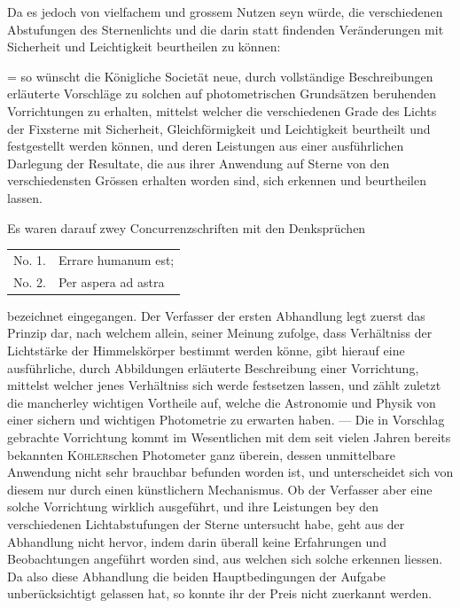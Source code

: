 Da es jedoch von vielfachem und grossem Nutzen seyn würde, die verschiedenen Abstufungen des Sternenlichts und die darin statt findenden Veränderungen mit Sicherheit und Leichtigkeit beurtheilen zu können:
\par\begingroup\leftskip=\parindent\parindent=0pt
\noindent so wünscht die Königliche Societät neue, durch vollständige Beschreibungen erläuterte Vorschläge zu solchen auf photometrischen Grundsätzen beruhenden Vorrichtungen zu erhalten, mittelst welcher die verschiedenen Grade des Lichts der Fixsterne mit Sicherheit, Gleichförmigkeit und Leichtigkeit beurtheilt und festgestellt werden können, und deren Leistungen aus einer ausführlichen Darlegung der Resultate, die aus ihrer Anwendung auf Sterne von den verschiedensten Grössen erhalten worden sind, sich erkennen und beurtheilen lassen.\par\endgroup
\noindent Es waren darauf zwey Concurrenzschriften mit den Denksprüchen\par
\noindent\hspace*{\parindent}\begin{tabular}{@{}l@{\quad}l@{}}
No. 1.&Errare humanum est;\\
No. 2.&Per aspera ad astra
\end{tabular}\par
\noindent bezeichnet eingegangen.
\clearpage{}
\noindent\hspace*{\parindent}Der Verfasser der ersten Abhandlung legt zuerst das Prinzip dar, nach welchem allein, seiner Meinung zufolge, dass Verhältniss der Lichtstärke der Himmelskörper bestimmt werden könne, gibt hierauf eine ausführliche, durch Abbildungen erläuterte Beschreibung einer Vorrichtung, mittelst welcher jenes Verhältniss sich werde festsetzen lassen, und zählt zuletzt die mancherley wichtigen Vortheile auf, welche die Astronomie und Physik von einer sichern und wichtigen Photometrie zu erwarten haben. --- Die in Vorschlag gebrachte Vorrichtung kommt im Wesentlichen mit dem seit vielen Jahren bereits bekannten \textsc{Köhler}schen Photometer ganz überein, dessen unmittelbare Anwendung nicht sehr brauchbar befunden worden ist, und unterscheidet sich von diesem nur durch einen künstlichern Mechanismus. Ob der Verfasser aber eine solche Vorrichtung wirklich ausgeführt, und ihre Leistungen bey den verschiedenen Lichtabstufungen der Sterne untersucht habe, geht aus der Abhandlung nicht hervor, indem darin überall keine Erfahrungen und Beobachtungen angeführt worden sind, aus welchen sich solche erkennen liessen. Da also diese Abhandlung die beiden Hauptbedingungen der Aufgabe unberücksichtigt gelassen hat, so konnte ihr der Preis nicht zuerkannt werden.

